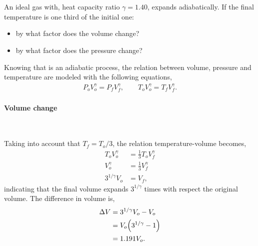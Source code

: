\documentclass[main.tex]{subfiles}
\begin{document}

\subsection{~}\label{subsec:5}
An ideal gas with, heat capacity ratio $\gamma = 1.40$, expands adiabatically. 
If the final temperature is one third of the initial one:
\begin{itemize}
    \item by what factor does the volume change?
    \item by what factor does the pressure change?
\end{itemize}

Knowing that is an adiabatic process, the relation between volume, pressure and temperature are modeled with the following equations,
\begin{gather*}
    P_oV_o^\gamma = P_fV_f^\gamma,\qquad T_oV_o^\gamma = T_fV_f^\gamma.
\end{gather*}

\paragraph{Volume change}~

Taking into account that $T_f = T_o/3$, the relation temperature-volume becomes,
\begin{align*}
    T_oV_o^\gamma &= \frac{1}{3}T_oV_f^\gamma \\
    V_o^\gamma &= \frac{1}{3}V_f^\gamma \\
    3^{1/\gamma}V_o &= V_f,
\end{align*}
indicating that the final volume expands $3^{1/\gamma}$ times with respect the original volume.
The difference in volume is,
\begin{align*}
    \Delta V &= 3^{1/\gamma}V_o - V_o \\
    &= V_o\qty(3^{1/\gamma} - 1) \\
    &= 1.191 V_o.
\end{align*}
\end{document}
